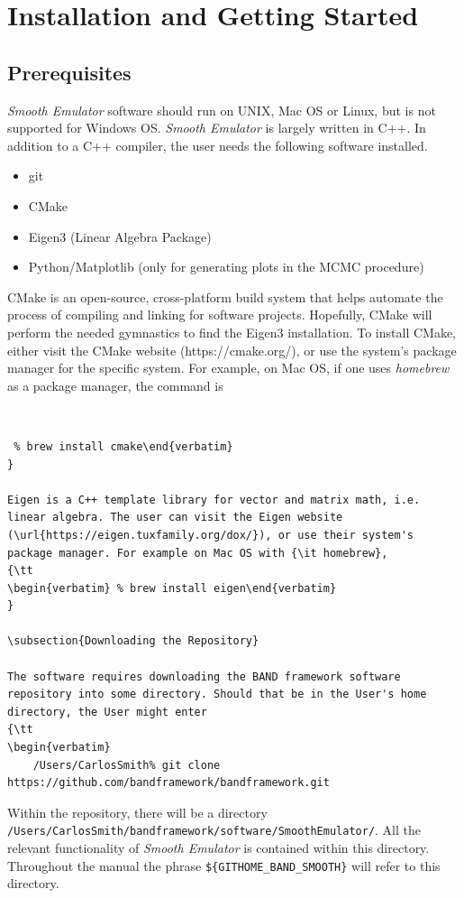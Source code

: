 \documentclass[UserManual.tex]{subfiles}
\begin{document}
\setcounter{section}{1}

\section{Installation and Getting Started}\label{sec:installation}

\subsection{Prerequisites}
{\it Smooth Emulator} software should run on UNIX, Mac OS or Linux, but is not supported for Windows OS. {\it Smooth Emulator} is largely  written in C++. In addition to a C++ compiler, the user needs the following software installed.

\begin{itemize}
    \item git
    \item CMake
    \item Eigen3 (Linear Algebra Package)
    \item Python/Matplotlib (only for generating plots in the MCMC procedure)
\end{itemize}

CMake is an open-source, cross-platform build system that helps automate the process of compiling and linking for software projects. Hopefully, CMake will perform the needed gymnastics to find the Eigen3 installation. To install CMake, either visit the CMake website (https://cmake.org/), or use the system's package manager for the specific system. For example, on Mac OS, if one uses {\it homebrew} as a package manager, the command is
{\tt 
\begin{verbatim} % brew install cmake\end{verbatim}
}

Eigen is a C++ template library for vector and matrix math, i.e. linear algebra. The user can visit the Eigen website (\url{https://eigen.tuxfamily.org/dox/}), or use their system's package manager. For example on Mac OS with {\it homebrew},
{\tt 
\begin{verbatim} % brew install eigen\end{verbatim}
}

\subsection{Downloading the Repository}

The software requires downloading the BAND framework software repository into some directory. Should that be in the User's home directory, the User might enter
{\tt 
\begin{verbatim}
    /Users/CarlosSmith% git clone https://github.com/bandframework/bandframework.git
\end{verbatim}
}
Within the repository, there will be a directory\\{\tt /Users/CarlosSmith/bandframework/software/SmoothEmulator/}. All the relevant functionality of {\it Smooth Emulator} is contained within this directory. Throughout the manual the phrase {\tt \$\{GITHOME\_BAND\_SMOOTH\}} will refer to this directory. 
\end{document}
